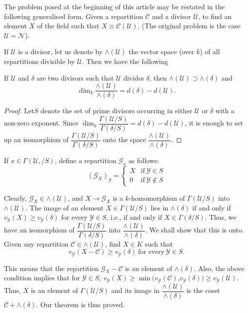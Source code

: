  The problem posed at the beginning of this article may be restated in
 the following generalised form. Given a repartition $\mathscr{C}$ and
 a divisor $\mathscr{U}$, to find an element $X$ of the field such that
 $X \equiv \mathscr{C} (\mathscr{U})$. (The original problem is the case
 $\mathscr{U} = \mathscr{N}$). 
 
 If $\mathscr{U}$ is a divisor, let us denote by $\wedge
 (\mathscr{U})$ the vector space (over $k$) of all repartitions
 divisible by $\mathscr{U}$. Then we have the following 
\begin{theorem*}
  If $\mathscr{U}$ and $\delta$ are two divisors such that
  $\mathscr{U}$ divides $\delta$, then $\wedge (\mathscr{U}) \supset
  \wedge (\delta)$ and 
  $$
  \dim_k \frac{\wedge (\mathscr{U})} {\wedge (\delta)} = d (\delta) -
  d(\mathscr{U}). 
  $$
\end{theorem*} 

\begin{proof}
  Let\pageoriginale $S$ denote the set of prime divisors occurring in either
  $\mathscr{U}$ or $\delta$ with a non-zero exponent. Since $\dim_k
  \dfrac{\Gamma(\mathscr{U}/S)} {\Gamma (\delta /S)} = d(\delta) -
  d(\mathscr{U})$, it is enough to set up an isomorphism of
  $\dfrac{\Gamma (\mathscr{U}/S)} {\Gamma (\delta/S)}$ onto the space
  $ \dfrac{\wedge (\mathscr{U})} {\wedge(\delta)}$. 
\end{proof} 
 
 If $x \in \Gamma (\mathscr{U},/S)$, define a repartition
 $\mathscr{G}_x$ as follows: 
 $$
 (\mathscr{G}_X)_\mathscr{Y} = 
 \begin{cases} 
   X &\text{if}~ \mathscr{Y} \in S \\ 
   0 & \text{if}~ \mathscr{Y} \notin S 
 \end{cases} 
 $$
 
Clearly, $\mathscr{G}_X \in \wedge (\mathscr{U})$, and $X \to
\mathscr{G}_X$ is a $k$-homomorphism of $\Gamma (\mathscr{U}/S)$ into
$\wedge (\mathscr{U})$. The image of an element $X \in \Gamma
(\mathscr{U}/S)$ lies in $\wedge(\delta)$ if and only if
$v_\mathscr{Y}(X) \ge v_\mathscr{Y}(\delta)$ for every $\mathscr{Y}
\in S$, i.e., if and only if $X \in \Gamma(\delta/S)$. Thus, we have
an isomorphism of $\dfrac{\Gamma(\mathscr{U}/S)} {\Gamma(\delta/S)}$
into $\dfrac{\wedge(\mathscr{U})}{\wedge (\delta)}$. We shall show
that this is onto. Given any repartition $\mathscr{C} \in \wedge
(\mathscr{U})$, find $X \in K$ such that 
$$
 v_\mathscr{Y}(X- \mathscr{C}) \ge v_\mathscr{Y} (\delta) ~\text{for
   every}~ \mathscr{Y} \in S. 
 $$
 
 This means that the repartition $\mathscr{G}_X - \mathscr{C}$ is an
 element of $\wedge(\delta)$. Also, the above condition implies that
 for $\mathscr{Y} \in S, ~ v_\mathscr{Y}(X)\ge \min
 (v_\mathscr{Y}(\mathscr{C})$,\break $v_\mathscr{Y}(\delta)) \ge v_\mathscr{Y}
 (\mathscr{U})$. Thus, $X$ is an element of $\Gamma (\mathscr{U}/S)$
 and its image in $\dfrac{\wedge(\mathscr{U})} {\wedge(\delta)}$ is
 the coset $\mathscr{C} + \wedge (\delta)$. Our theorem is thus
 proved. 
